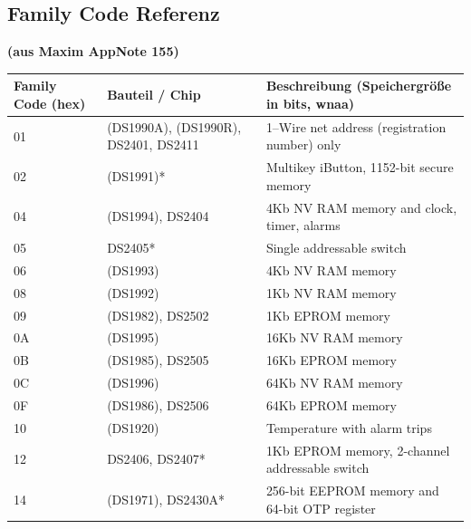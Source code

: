 
{
\subsection{Family Code Referenz}
}
\textbf{(aus Maxim AppNote 155)}

\begin{center}
\begin{tabular}{|p{}|p{}|p{}|}
\hline
\textbf{Family Code (hex)}
   & \textbf{Bauteil / Chip}              & \textbf{Beschreibung \newline (Speichergröße in bits, wnaa)} \\ \hline
01 & (DS1990A), (DS1990R), DS2401, DS2411 & 1--Wire net address (registration number) only \\ \hline
02 & (DS1991)*                            & Multikey iButton, 1152-bit secure memory \\ \hline
04 & (DS1994), DS2404                     & 4Kb NV RAM memory and clock, timer, alarms \\ \hline
05 & DS2405*                              & Single addressable switch \\\hline
06 & (DS1993)                             & 4Kb NV RAM memory \\ \hline
08 & (DS1992)                             & 1Kb NV RAM memory \\ \hline
09 & (DS1982), DS2502                     & 1Kb EPROM memory \\ \hline
0A & (DS1995)                             & 16Kb NV RAM memory \\ \hline
0B & (DS1985), DS2505                     & 16Kb EPROM memory \\ \hline
0C & (DS1996)                             & 64Kb NV RAM memory \\ \hline
0F & (DS1986), DS2506                     & 64Kb EPROM memory \\ \hline
10 & (DS1920)                             & Temperature with alarm trips \\ \hline
12 & DS2406, DS2407*                      & 1Kb EPROM memory, 2-channel addressable switch \\ \hline
14 & (DS1971), DS2430A*                   & 256-bit EEPROM memory and 64-bit OTP register \\ \hline

\end{tabular}
\end{center}
